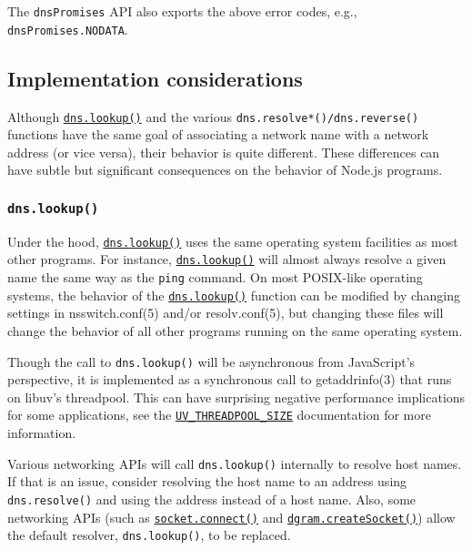 The \texttt{dnsPromises} API also exports the above error codes, e.g.,
\texttt{dnsPromises.NODATA}.

\subsection{Implementation
considerations}\label{implementation-considerations}

Although
\hyperref[dnslookuphostname-options-callback]{\texttt{dns.lookup()}} and
the various \texttt{dns.resolve*()/dns.reverse()} functions have the
same goal of associating a network name with a network address (or vice
versa), their behavior is quite different. These differences can have
subtle but significant consequences on the behavior of Node.js programs.

\subsubsection{\texorpdfstring{\texttt{dns.lookup()}}{dns.lookup()}}\label{dns.lookup}

Under the hood,
\hyperref[dnslookuphostname-options-callback]{\texttt{dns.lookup()}}
uses the same operating system facilities as most other programs. For
instance,
\hyperref[dnslookuphostname-options-callback]{\texttt{dns.lookup()}}
will almost always resolve a given name the same way as the
\texttt{ping} command. On most POSIX-like operating systems, the
behavior of the
\hyperref[dnslookuphostname-options-callback]{\texttt{dns.lookup()}}
function can be modified by changing settings in nsswitch.conf(5) and/or
resolv.conf(5), but changing these files will change the behavior of all
other programs running on the same operating system.

Though the call to \texttt{dns.lookup()} will be asynchronous from
JavaScript's perspective, it is implemented as a synchronous call to
getaddrinfo(3) that runs on libuv's threadpool. This can have surprising
negative performance implications for some applications, see the
\href{cli.md\#uv_threadpool_sizesize}{\texttt{UV\_THREADPOOL\_SIZE}}
documentation for more information.

Various networking APIs will call \texttt{dns.lookup()} internally to
resolve host names. If that is an issue, consider resolving the host
name to an address using \texttt{dns.resolve()} and using the address
instead of a host name. Also, some networking APIs (such as
\href{net.md\#socketconnectoptions-connectlistener}{\texttt{socket.connect()}}
and
\href{dgram.md\#dgramcreatesocketoptions-callback}{\texttt{dgram.createSocket()}})
allow the default resolver, \texttt{dns.lookup()}, to be replaced.

